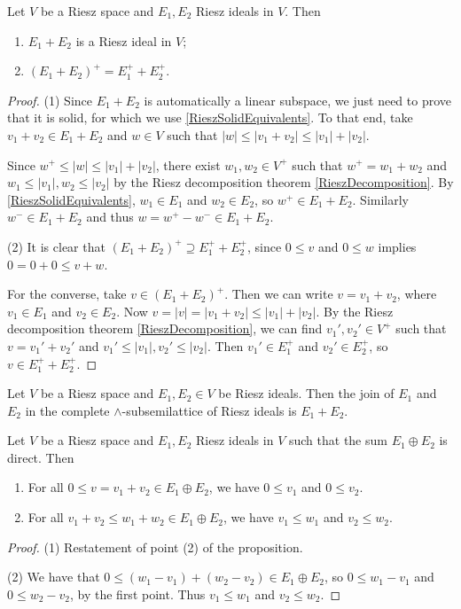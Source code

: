 \begin{proposition} \label{sumRieszIdeals}
Let $V$ be a Riesz space and $E_1, E_2$ Riesz ideals in $V$. Then
\begin{enumerate}
\item $E_1 + E_2$ is a Riesz ideal in $V$;
\item $(E_1 + E_2)^+ = E_1^+ + E_2^+$.
\end{enumerate}
\end{proposition}
\begin{proof}
(1) Since $E_1+E_2$ is automatically a linear subspace, we just need to prove that it is solid, for which we use \ref{RieszSolidEquivalents}. To that end, take $v_1+v_2\in E_1+E_2$ and $w\in V$ such that $|w| \leq |v_1 + v_2| \leq |v_1| + |v_2|$.

Since $w^+ \leq |w| \leq |v_1| + |v_2|$, there exist $w_1, w_2\in V^+$ such that $w^+= w_1+w_2$ and $w_1\leq |v_1|, w_2\leq |v_2|$ by the Riesz decomposition theorem \ref{RieszDecomposition}. By \ref{RieszSolidEquivalents}, $w_1\in E_1$ and $w_2\in E_2$, so $w^+\in E_1+E_2$. Similarly $w^-\in E_1+E_2$ and thus $w = w^+-w^-\in E_1+E_2$.

(2) It is clear that $(E_1 + E_2)^+ \supseteq E_1^+ + E_2^+$, since $0\leq v$ and $0\leq w$ implies $0 = 0+0\leq v+w$.

For the converse, take $v\in (E_1+E_2)^+$. Then we can write $v = v_1+v_2$, where $v_1\in E_1$ and $v_2\in E_2$. Now $v = |v| = |v_1 + v_2| \leq |v_1| + |v_2|$. By the Riesz decomposition theorem \ref{RieszDecomposition}, we can find $v_1',v_2'\in V^+$ such that $v = v_1'+v_2'$ and $v_1'\leq |v_1|, v_2'\leq |v_2|$. Then $v_1'\in E_1^+$ and $v_2'\in E_2^+$, so $v\in E_1^+ + E_2^+$.
\end{proof}
\begin{corollary}
Let $V$ be a Riesz space and $E_1,E_2\in V$ be Riesz ideals. Then the join of $E_1$ and $E_2$ in the complete $\wedge$-subsemilattice of Riesz ideals is $E_1+E_2$.
\end{corollary}
\begin{corollary} \label{RieszIdealDirectSumPreservesOrder}
Let $V$ be a Riesz space and $E_1, E_2$ Riesz ideals in $V$ such that the sum $E_1\oplus E_2$ is direct. Then
\begin{enumerate}
\item For all $0\leq v = v_1 + v_2 \in E_1\oplus E_2$, we have $0\leq v_1$ and $0\leq v_2$.
\item For all $v_1 +v_2 \leq w_1 + w_2 \in E_1\oplus E_2$, we have $v_1 \leq w_1$ and $v_2 \leq w_2$.
\end{enumerate}
\end{corollary}
\begin{proof}
(1) Restatement of point (2) of the proposition.

(2) We have that $0\leq (w_1 - v_1) + (w_2 - v_2) \in E_1\oplus E_2$, so $0\leq w_1 - v_1$ and $0\leq w_2 - v_2$, by the first point. Thus $v_1\leq w_1$ and $v_2\leq w_2$.
\end{proof}

